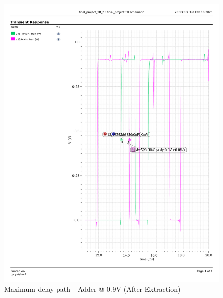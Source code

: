 \documentclass[a4paper,12pt]{article}
\begin{document}
\begin{figure}[H]
\begin{minipage}{0.49\textwidth}
        \includegraphics[width=\textwidth]{delay/CP_max_add_0.9_ex.pdf}
        \caption{Maximum delay path - Adder @ 0.9V (After Extraction)}
    \end{minipage}
\end{figure}
\end{document}
